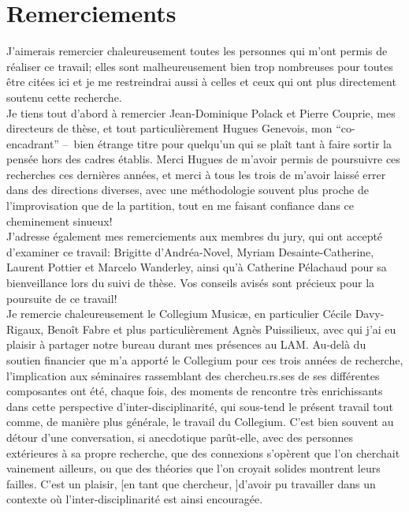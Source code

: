 %
\chapter*{Remerciements}
\label{sec:acknowledgement}
\vspace*{-10mm}


J'aimerais remercier chaleureusement toutes les personnes qui m'ont permis de réaliser ce travail; elles sont malheureusement bien trop nombreuses pour toutes être citées ici et je me restreindrai aussi à celles et ceux qui ont plus directement soutenu cette recherche.\\
\indent Je tiens tout d'abord à remercier Jean-Dominique Polack et Pierre Couprie, mes directeurs de thèse, et tout particulièrement Hugues Genevois, mon ``co-encadrant'' --~bien étrange titre pour quelqu'un qui se plaît tant à faire sortir la pensée hors des cadres établis. Merci Hugues de m'avoir permis de poursuivre ces recherches ces dernières années, et merci à tous les trois de m'avoir laissé errer dans des directions diverses, avec une méthodologie souvent plus proche de l'improvisation que de la partition, tout en me faisant confiance dans ce cheminement sinueux!\\
\indent J'adresse également mes remerciements aux membres du jury, qui ont accepté d'examiner ce travail: Brigitte d'Andréa-Novel, Myriam Desainte-Catherine, Laurent Pottier et Marcelo Wanderley, ainsi qu'à Catherine Pélachaud pour sa bienveillance lors du suivi de thèse. Vos conseils avisés sont précieux pour la poursuite de ce travail!\\
\indent Je remercie chaleureusement le Collegium Musicæ, en particulier Cécile Davy-Rigaux, Benoît Fabre et plus particulièrement Agnès Puissilieux, avec qui j'ai eu plaisir à partager notre bureau durant mes présences au LAM. Au-delà du soutien financier que m'a apporté le Collegium pour ces trois années de recherche, l'implication aux séminaires rassemblant des chercheu.rs.ses de ses différentes composantes ont été, chaque fois, des moments de rencontre très enrichissants dans cette perspective d'inter-disciplinarité, qui sous-tend le présent travail tout comme, de manière plus générale, le travail du Collegium. C'est bien souvent au détour d'une conversation, si anecdotique parût-elle, avec des personnes extérieures à sa propre recherche, que des connexions s'opèrent que l'on cherchait vainement ailleurs, ou que des théories que l'on croyait solides montrent leurs failles. C'est un plaisir, [en tant que chercheur, ]d'avoir pu travailler dans un contexte où l'inter-disciplinarité est ainsi encouragée.\\
